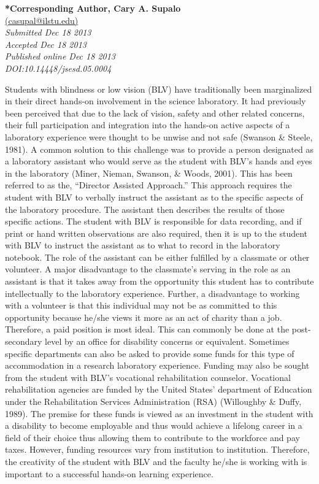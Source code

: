 \documentclass[11.5pt]{sig-alternate} %
\begin{document}
\textbf{*Corresponding Author, Cary A. Supalo}\\
\href{mailto: casupal@ilstu.edu }{(casupal@ilstu.edu)} \\
\textit{Submitted  Dec 18 2013}\\
\textit{Accepted Dec 18 2013} \\
\textit{Published online Dec 18 2013} \\
\textit{DOI:10.14448/jsesd.05.0004} \\
\pagebreak
\clearpage
\begin{large}

Students with blindness or low vision (BLV) have traditionally been marginalized in their direct hands-on involvement in the science laboratory. It had previously been perceived that due to the lack of vision, safety and other related concerns, their full participation and integration into the hands-on active aspects of a laboratory experience were thought to be unwise and not safe (Swanson \& Steele, 1981). A common solution to this challenge was to provide a person designated as a laboratory assistant who would serve as the student with BLV’s hands and eyes in the laboratory (Miner, Nieman, Swanson, \& Woods, 2001). This has been referred to as the, “Director Assisted Approach.” This approach requires the student with BLV to verbally instruct the assistant as to the specific aspects of the laboratory procedure. The assistant then describes the results of those specific actions. The student with BLV is responsible for data recording, and if print or hand written observations are also required, then it is up to the student with BLV to instruct the assistant as to what to record in the laboratory notebook. The role of the assistant can be either fulfilled by a classmate or other volunteer. A major disadvantage to the classmate’s serving in the role as an assistant is that it takes away from the opportunity this student has to contribute intellectually to the laboratory experience. Further, a disadvantage to working with a volunteer is that this individual may not be as committed to this opportunity because he/she views it more as an act of charity than a job. Therefore, a paid position is most ideal. This can commonly be done at the post-secondary level by an office for disability concerns or equivalent. Sometimes specific departments can also be asked to provide some funds for this type of accommodation in a research laboratory experience. Funding may also be sought from the student with BLV’s vocational rehabilitation counselor. Vocational rehabilitation agencies are funded by the United States’ department of Education under the Rehabilitation Services Administration (RSA) (Willoughby \& Duffy, 1989). The premise for these funds is viewed as an investment in the student with a disability to become employable and thus would achieve a lifelong career in a field of their choice thus allowing them to contribute to the workforce and pay taxes. However, funding resources vary from institution to institution. Therefore, the creativity of the student with BLV and the faculty he/she is working with is important to a successful hands-on learning experience.


\end{large}
\end{document}
